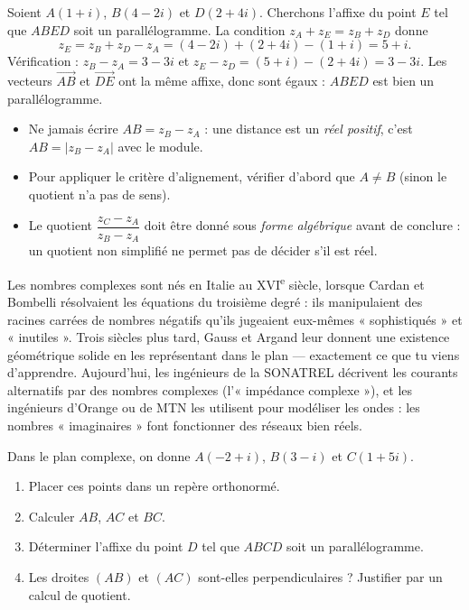 \documentclass[11pt]{article}
\begin{document}
\begin{exemplebox}
Soient $A(1 + i)$, $B(4 - 2i)$ et $D(2 + 4i)$. Cherchons l'affixe du point $E$ tel que $ABED$ soit un parallélogramme. La condition $z_A + z_E = z_B + z_D$ donne
\[ z_E = z_B + z_D - z_A = (4 - 2i) + (2 + 4i) - (1 + i) = 5 + i. \]
Vérification : $z_B - z_A = 3 - 3i$ et $z_E - z_D = (5 + i) - (2 + 4i) = 3 - 3i$. Les vecteurs $\overrightarrow{AB}$ et $\overrightarrow{DE}$ ont la même affixe, donc sont égaux : $ABED$ est bien un parallélogramme.
\end{exemplebox}

\begin{attention}
\begin{itemize}
\item Ne jamais écrire $AB = z_B - z_A$ : une distance est un \emph{réel positif}, c'est $AB = |z_B - z_A|$ avec le module.
\item Pour appliquer le critère d'alignement, vérifier d'abord que $A \neq B$ (sinon le quotient n'a pas de sens).
\item Le quotient $\dfrac{z_C - z_A}{z_B - z_A}$ doit être donné sous \emph{forme algébrique} avant de conclure : un quotient non simplifié ne permet pas de décider s'il est réel.
\end{itemize}
\end{attention}

\begin{savaistu}
Les nombres complexes sont nés en Italie au XVI\textsuperscript{e} siècle, lorsque Cardan et Bombelli résolvaient les équations du troisième degré : ils manipulaient des racines carrées de nombres négatifs qu'ils jugeaient eux-mêmes « sophistiqués » et « inutiles ». Trois siècles plus tard, Gauss et Argand leur donnent une existence géométrique solide en les représentant dans le plan — exactement ce que tu viens d'apprendre. Aujourd'hui, les ingénieurs de la SONATREL décrivent les courants alternatifs par des nombres complexes (l'« impédance complexe »), et les ingénieurs d'Orange ou de MTN les utilisent pour modéliser les ondes : les nombres « imaginaires » font fonctionner des réseaux bien réels.
\end{savaistu}

\begin{exercice}
Dans le plan complexe, on donne $A(-2 + i)$, $B(3 - i)$ et $C(1 + 5i)$.
\begin{enumerate}
\item Placer ces points dans un repère orthonormé.
\item Calculer $AB$, $AC$ et $BC$.
\item Déterminer l'affixe du point $D$ tel que $ABCD$ soit un parallélogramme.
\item Les droites $(AB)$ et $(AC)$ sont-elles perpendiculaires ? Justifier par un calcul de quotient.
\end{enumerate}
\end{exercice}
\end{document}
